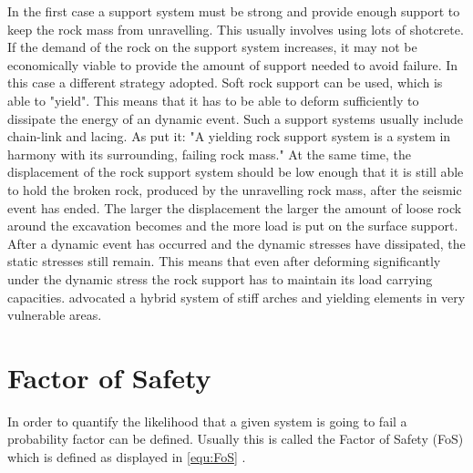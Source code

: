 In the first case a support system must be strong and provide enough support to keep the rock mass from unravelling. This usually involves using lots of shotcrete. If the demand of the rock on the support system increases, it may not be economically viable to provide the amount of support needed to avoid failure. In this case a different strategy adopted. Soft rock support can be used, which is able to "yield". This means that it has to be able to deform sufficiently to dissipate the energy of an dynamic event. \autocite[220]{Kaiser12} Such a support systems usually include chain-link and lacing. As \textcite[220]{Kaiser12} put it: "A yielding rock support system is a system in harmony with its surrounding, failing rock mass." At the same time, the displacement of the rock support system should be low enough that it is still able to hold the broken rock, produced by the unravelling rock mass, after the seismic event has ended. The larger the displacement the larger the amount of loose rock around the excavation becomes and the more load is put on the surface support.\autocite[7]{villa13} 
After a dynamic event has occurred and the dynamic stresses have dissipated, the static stresses still remain. This means that even after deforming significantly under the dynamic stress
the rock support has to maintain its load carrying capacities. %
\autocite[77]{Heal10}
\textcite[13]{Simser07} advocated a hybrid system of stiff arches and yielding elements in very vulnerable areas.

 

\section{Factor of Safety}

In order to quantify the likelihood that a given system is going to fail a probability factor can be defined.
Usually this is called the Factor of Safety (FoS) which is defined as displayed in \autoref{equ:FoS} \autocite[3.15]{canada96}.

